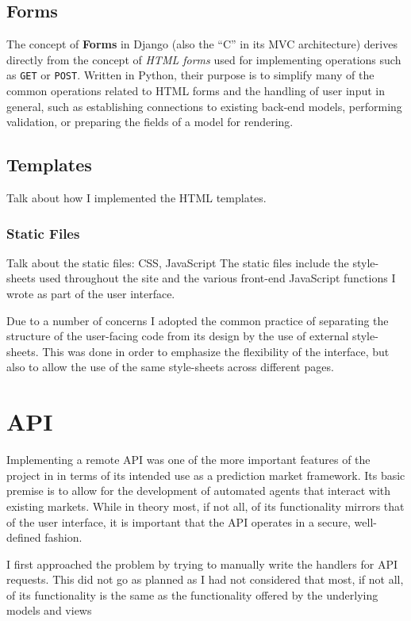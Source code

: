 \documentclass[bsc,frontabs,twoside,singlespacing,parskip,deptreport]{infthesis}     %
\begin{document}
\begin{itemize}
\subsection{Forms}
	The concept of {\bf Forms} in Django (also the ``C'' in its MVC architecture) derives directly from the concept of {\em HTML forms} used for implementing operations such as {\tt GET} or {\tt POST}. Written in Python, their purpose is to simplify many of the common operations related to HTML forms and the handling of user input in general, such as establishing connections to existing back-end models, performing validation, or preparing the fields of a model for rendering. 


\subsection{Templates}
 Talk about how I implemented the HTML templates. 

\subsubsection{Static Files}
Talk about the static files: CSS, JavaScript
	The static files include the style-sheets used throughout the site and the various front-end JavaScript functions I wrote as part of the user interface. 

	Due to a number of concerns I adopted the common practice of separating the structure of the user-facing code from its design by the use of external style-sheets. This was done in order to emphasize the flexibility of the interface, but also to allow the use of the same style-sheets across different pages. 

	

\section{API}
    
    Implementing a remote API was one of the more important features of the project in in terms of its intended use as a prediction market framework. Its basic premise is to allow for the development of automated agents that interact with existing markets. While in theory most, if not all, of its functionality mirrors that of the user interface, it is important that the API operates in a secure, well-defined fashion.
    
    I first approached the problem by trying to manually write the handlers for API requests. This did not go as planned as I had not considered that most, if not all, of its functionality is the same as the functionality offered by the underlying models and views 


\end{itemize}
\end{document}

